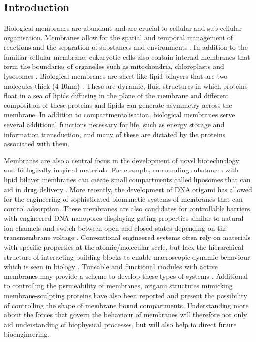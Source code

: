 \chapter{\label{ch:2-elastic}\chelastic} 

\minitoc

\section{Introduction}

Biological membranes are abundant and are crucial to cellular and sub-cellular organisation. Membranes allow for the spatial and temporal management of reactions and the separation of substances and environments \cite{simunovic_when_2015}. In addition to the familiar cellular membrane, eukaryotic cells also contain internal membranes that form the boundaries of organelles such as mitochondria, chloroplasts and lysosomes \cite{zimmerberg_how_2006}. Biological membranes are sheet-like lipid bilayers that are two molecules thick (4-10nm) \cite{berg_biochemistry_2002}. These are dynamic, fluid structures in which proteins float in a sea of lipids diffusing in the plane of the membrane and different composition of these proteins and lipids can generate asymmetry across the membrane. In addition to compartmentalisation, biological membranes serve several additional functions necessary for life, such as energy storage and information transduction, and many of these are dictated by the proteins associated with them.

Membranes are also a central focus in the development of novel biotechnology and biologically inspired materials. For example, surrounding substances with lipid bilayer membranes can create small compartments called liposomes that can aid in drug delivery \cite{lasic_applications_1995}. More recently, the development of DNA origami \cite{rothemund_folding_2006} has allowed for the engineering of sophisticated biomimetic systems of membranes that can control adsorption. These membranes are also candidates for controllable barriers, with engineered DNA nanopores displaying gating properties similar to natural ion channels and switch between open and closed states depending on the transmembrane voltage \cite{seifert_bilayer-spanning_2015}. Conventional engineered systems often rely on materials with specific properties at the atomic/molecular scale, but lack the hierarchical structure of interacting building blocks to enable macroscopic dynamic behaviour which is seen in biology \cite{studart_biologically_2015}. Tuneable and functional modules with active membranes may provide a scheme to develop these types of systems \cite{czogalla_dna_2016}. Additional to controlling the permeability of membranes, origami structures mimicking membrane-sculpting proteins have also been reported \cite{czogalla_amphipathic_2015} and present the possibility of controlling the shape of membrane bound compartments. Understanding more about the forces that govern the behaviour of membranes will therefore not only aid understanding of biophysical processes, but will also help to direct future bioengineering.

